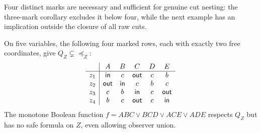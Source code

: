 Four distinct marks are necessary and sufficient for genuine cut nesting:
the three-mark corollary excludes it below four, while the next example
has an implication outside the closure of all raw cuts.

\begin{proposition}
\label{core:prop:grouped-cut-nesting}
On five variables, the following four marked rows, each with exactly
two free coordinates, give
$Q_Z\subsetneq\preceq_Z$:
\[
\begin{array}{c|ccccc}
 &A&B&C&D&E\\\hline
 z_1&\mathsf{in}&c&\mathsf{out}&c&b\\
 z_2&\mathsf{out}&\mathsf{in}&c&b&c\\
 z_3&c&b&\mathsf{in}&c&\mathsf{out}\\
 z_4&b&c&\mathsf{out}&c&\mathsf{in}
\end{array}
\]
The monotone Boolean function
$f=ABC\vee BCD\vee ACE\vee ADE$ respects $Q_Z$ but has no safe
formula on $Z$, even allowing observer union.
\end{proposition}
